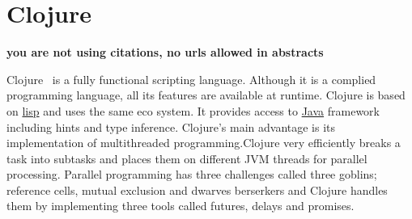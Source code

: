 \section{Clojure}

{\bf you are not using citations, no urls allowed in abstracts}

Clojure~\cite{hid-sp18-413-clojure} is a fully functional scripting
language. Although it is a complied programming language, all its
features are available at runtime. Clojure is based on
\href{https://en.wikipedia.org/wiki/Lisp_s
  (programming_language)}{lisp} and uses the same eco system. It
provides access to \href{https://en.wikipedia.org/wiki/Java_s
  (programming_language)}{Java} framework including hints and type
inference. Clojure’s main advantage is its implementation of
multithreaded programming.Clojure very efficiently breaks a task into
subtasks and places them on different JVM threads for parallel
processing. Parallel programming has three challenges called three
goblins; reference cells, mutual exclusion and dwarves berserkers and
Clojure handles them by implementing three tools called futures,
delays and promises.
